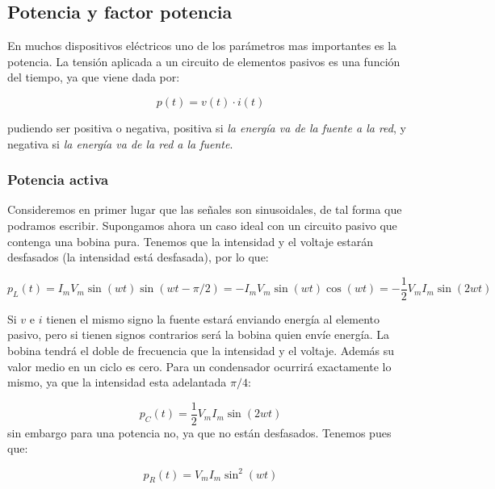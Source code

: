 \documentclass[12pt,a4paper]{article}
\begin{document}
\subsection{Potencia y factor potencia}

En muchos dispositivos eléctricos uno de los parámetros mas importantes es la potencia. La tensión aplicada a un circuito de elementos pasivos es una función del tiempo, ya que viene dada por:

\begin{equation}
p(t) = v(t) \cdot i(t)
\end{equation}

pudiendo ser positiva o negativa, positiva si \textit{la energía va de la fuente a la red}, y negativa si \textit{la energía va de la red a la fuente}. 


\subsubsection{Potencia activa}
Consideremos en primer lugar que las señales son sinusoidales, de tal forma que podramos escribir. Supongamos ahora un caso ideal con un circuito pasivo que contenga una bobina pura. Tenemos que la intensidad y el voltaje estarán desfasados (la intensidad está desfasada), por lo que: 

\begin{equation}
p_L(t) = I_m V_m \sin (w t) \sin (w t - \pi/2) = - I_m V_m \sin (wt) \cos(wt) = -\dfrac{1}{2} V_m I_m \sin (2 wt)
\end{equation}

Si $v$ e $i$ tienen el mismo signo la fuente estará enviando energía al elemento pasivo, pero si tienen signos contrarios será la bobina quien envíe energía. La bobina tendrá el doble de frecuencia que la intensidad y el voltaje. Además su valor medio en un ciclo es cero. Para un condensador ocurrirá exactamente lo mismo, ya que la intensidad esta adelantada $\pi/4$:

\begin{equation}
p_C (t) = \dfrac{1}{2} V_m I_m \sin (2wt)
\end{equation}
sin embargo para una potencia no, ya que no están desfasados. Tenemos pues que:

\begin{equation}
p_R (t) = V_m I_m \sin^2 (wt) 
\end{equation}
\end{document}
